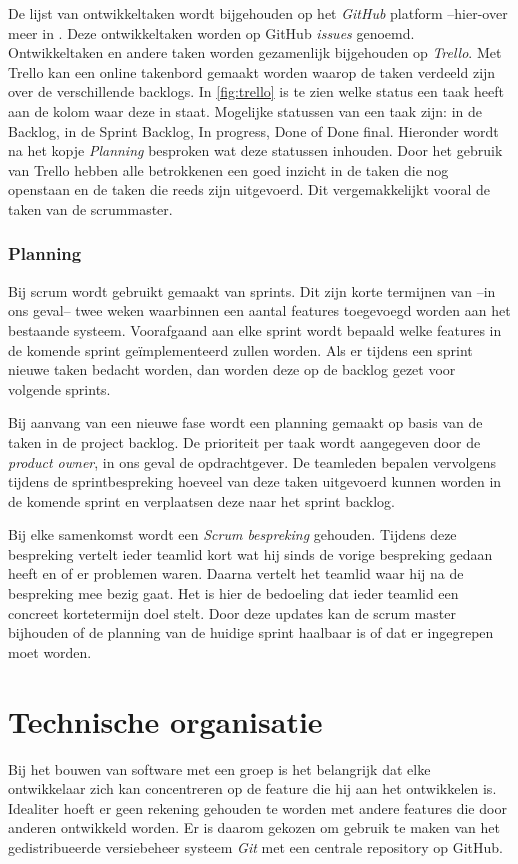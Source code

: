 De lijst van ontwikkeltaken wordt bijgehouden op het \emph{GitHub} platform --{hier-over} meer in . Deze ontwikkeltaken worden op GitHub \emph{issues} genoemd. Ontwikkeltaken en andere taken worden gezamenlijk bijgehouden op \emph{Trello}. Met Trello kan een online takenbord gemaakt worden waarop de taken verdeeld zijn over de verschillende backlogs. In \autoref{fig:trello} is te zien welke status een taak heeft aan de kolom waar deze in staat. Mogelijke statussen van een taak zijn: in de Backlog, in de Sprint Backlog, In progress, Done of Done final. Hieronder wordt na het kopje \emph{Planning} besproken wat deze statussen inhouden. Door het gebruik van Trello hebben alle betrokkenen een goed inzicht in de taken die nog openstaan en de taken die reeds zijn uitgevoerd. Dit vergemakkelijkt vooral de taken van de scrummaster.

\subsubsection{Planning}
Bij scrum wordt gebruikt gemaakt van sprints. Dit zijn korte termijnen van --in ons geval-- twee weken waarbinnen een aantal features toegevoegd worden aan het bestaande systeem. Voorafgaand aan elke sprint wordt bepaald welke features in de komende sprint geïmplementeerd zullen worden. Als er tijdens een sprint nieuwe taken bedacht worden, dan worden deze op de backlog gezet voor volgende sprints.

Bij aanvang van een nieuwe fase wordt een planning gemaakt op basis van de taken in de project backlog. De prioriteit per taak wordt aangegeven door de \emph{product owner}, in ons geval de opdrachtgever. De teamleden bepalen vervolgens tijdens de sprintbespreking hoeveel van deze taken uitgevoerd kunnen worden in de komende sprint en verplaatsen deze naar het sprint backlog.

Bij elke samenkomst wordt een \emph{Scrum bespreking} gehouden. Tijdens deze bespreking vertelt ieder teamlid kort wat hij sinds de vorige bespreking gedaan heeft en of er problemen waren. Daarna vertelt het teamlid waar hij na de bespreking mee bezig gaat. Het is hier de bedoeling dat ieder teamlid een concreet kortetermijn doel stelt. Door deze updates kan de scrum master bijhouden of de planning van de huidige sprint haalbaar is of dat er ingegrepen moet worden.

\section{Technische organisatie} \label{sec:technische_organisatie}
Bij het bouwen van software met een groep is het belangrijk dat elke ontwikkelaar zich kan concentreren op de feature die hij aan het ontwikkelen is. Idealiter hoeft er geen rekening gehouden te worden met andere features die door anderen ontwikkeld worden. Er is daarom gekozen om gebruik te maken van het gedistribueerde versiebeheer systeem \emph{Git} met een centrale repository op GitHub.

